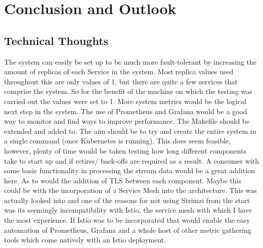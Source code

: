 \chapter{Conclusion and Outlook}
\label{chap:conclusion}

\section{Technical Thoughts}
\begin{flushleft}
	The system can easily be set up to be much more fault-tolerant by increasing the amount of replicas of each Service in the system.
	Most replica values used throughout this are only values of 1, but there are quite a few services that comprise the system. So for the
	benefit of the machine on which the testing was carried out the values were set to 1.
	\bigbreak
	More system metrics would be the logical next step in the system. The use of Prometheus and Grafana would be a good way to monitor and
	find ways to improve performance.
	\bigbreak
	The Makefile should be extended and added to. The aim should be to try and create the entire system in a single command (once Kubernetes
	is running). This does seem feasible, however, plenty of time would be taken testing how long different components take to start up and if
	retires/ back-offs are required as a result.
	\bigbreak
	A consumer with some basic functionality in processing the stream data would be a great addition here.
	\bigbreak
	As to would the addition of TLS between each component. Maybe this could be with the incorporation of a Service Mesh into the architecture.
	This was actually looked into and one of the reasons for not using Strimzi from the start was its seemingly incompatibility with Istio,
	the service mesh with which I have the most experience. If Istio was to be incorporated that would enable the easy automation of Prometheus,
	Grafana and a whole host of other metric gathering tools which come natively with an Istio deployment.

\end{flushleft}
